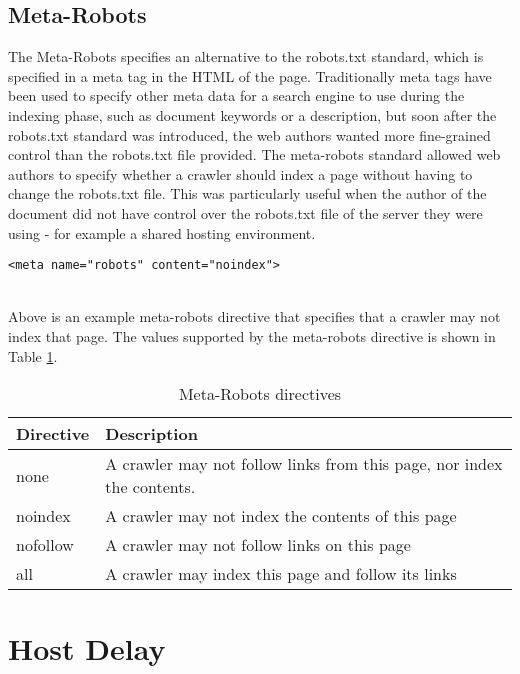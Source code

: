 \subsection{Meta-Robots}\label{sect-metarobots}
The Meta-Robots\cite{site5} specifies an alternative to the robots.txt standard, which is specified in a meta tag in the HTML of the page. Traditionally meta tags have been used to specify other meta data for a search engine to use during the indexing phase, such as document keywords or a description, but soon after the robots.txt standard was introduced, the web authors wanted more fine-grained control than the robots.txt file provided. The meta-robots standard allowed web authors to specify whether a crawler should index a page without having to change the robots.txt file. This was particularly useful when the author of the document did not have control over the robots.txt file of the server they were using - for example a shared hosting environment.
\indent \begin{verbatim}<meta name="robots" content="noindex">\end{verbatim}\\
Above is an example meta-robots directive that specifies that a crawler may not index that page. The values supported by the meta-robots directive is shown in Table \ref{tbl-metarobots}.
\renewcommand{\baselinestretch}{1.0}
\begin{table}
\begin{center}
\begin{tabular}{|l|l|}
\hline
\bf{Directive} & \bf{Description} \\
\hline
none & A crawler may not follow links from this page, nor index the contents.\\
\hline
noindex & A crawler may not index the contents of this page \\
\hline
nofollow & A crawler may not follow links on this page \\
\hline
all & A crawler may index this page and follow its links \\
\hline
\end{tabular}
\caption{Meta-Robots directives}\label{tbl-metarobots}
\end{center}
\end{table}
\renewcommand{\baselinestretch}{1.5}

\section{Host Delay}

